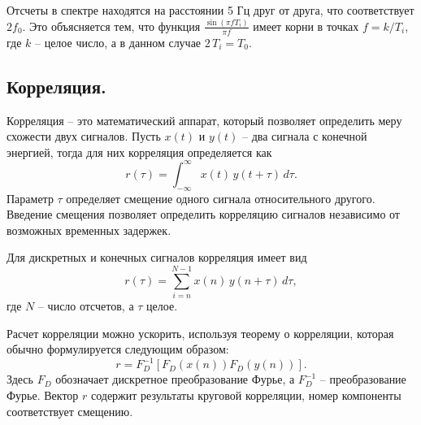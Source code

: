 \documentclass[a4paper,14pt]{extarticle}
\begin{document}
Отсчеты в спектре находятся на расстоянии 5 Гц друг от друга, что соответствует $2f_0$. Это объясняется тем, что функция $\frac{\sin(\pi f T_i)}{\pi f}$ имеет корни в точках $f = k/T_i$, где $k$ -- целое число, а в данном случае $2\,T_i = T_0$.

\subsection{Корреляция.}

Корреляция -- это математический аппарат, который позволяет определить меру схожести двух сигналов. 
Пусть $x(t)$ и $y(t)$ -- два сигнала с конечной энергией, тогда для них корреляция определяется как 
\begin{equation*}
r(\tau) = \int_{-\infty}^{\infty} x(t)\,y(t+\tau)\,d\tau.
\end{equation*} 
Параметр $\tau$ определяет смещение одного сигнала относительного другого. Введение смещения позволяет определить корреляцию сигналов независимо от возможных временных задержек.

Для дискретных и конечных сигналов корреляция имеет вид 
\begin{equation*}
r(\tau) = \sum_{i=n}^{N-1} x(n)\,y(n+\tau)\,d\tau,
\end{equation*} 
где $N$ -- число отсчетов, а $\tau$ целое.

Расчет корреляции можно ускорить, используя теорему о корреляции, которая обычно формулируется следующим образом:
\begin{equation*}
r = F_D^{-1} [F_D(x(n))F_D(y(n))].
\end{equation*} 
Здесь $F_D$ обозначает дискретное преобразование Фурье, а $F_D^{-1}$ -- преобразование Фурье. Вектор $r$ содержит результаты круговой корреляции, номер компоненты соответствует смещению.
\end{document}
